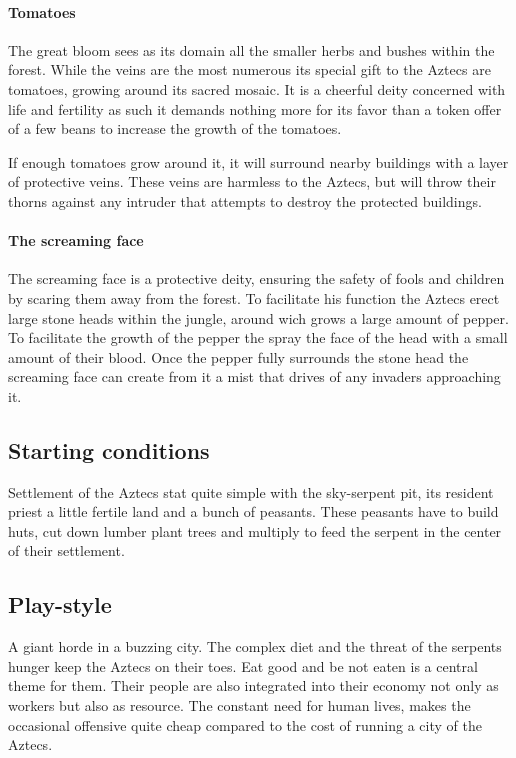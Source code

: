 \documentclass[a4paper]{book}
\begin{document}
\paragraph{Tomatoes}
The great bloom sees as its domain all the smaller herbs and bushes within the
forest. While the veins are the most numerous its special gift to the
\gls{Aztecs} are tomatoes, growing around its sacred mosaic. It is a cheerful
deity concerned with life and fertility as such it demands nothing more for its
favor than a token offer of a few beans to increase the growth of the tomatoes.

If enough tomatoes grow around it, it will surround nearby buildings with a
layer of protective veins. These veins are harmless to the \gls{Aztecs}, but
will throw their thorns against any intruder that attempts to destroy the
protected buildings.

\paragraph{The screaming face}
The screaming face is a protective deity, ensuring the safety of fools and
children by scaring them away from the forest. To facilitate his function the
\gls{Aztecs} erect large stone heads within the jungle, around wich grows a
large amount of pepper. To facilitate the growth of the pepper the spray the
face of the head with a small amount of their blood. Once the pepper fully
surrounds the stone head the screaming face can create from it a mist that
drives of any invaders approaching it.

\subsection{Starting conditions}
Settlement of the \gls{Aztecs} stat quite simple with the sky-serpent pit, its
resident priest a little fertile land and a bunch of peasants. These peasants
have to build huts, cut down lumber plant trees and multiply to feed the
serpent in the center of their settlement.

\subsection{Play-style}
A giant horde in a buzzing city. The complex diet and the threat of the
serpents hunger keep the \gls{Aztecs} on their toes. Eat good and be not eaten
is a central theme for them. Their people are also integrated into their
economy not only as workers but also as resource. The constant need for human
lives, makes the occasional offensive quite cheap compared to the cost of
running a city of the \gls{Aztecs}.
\end{document}
